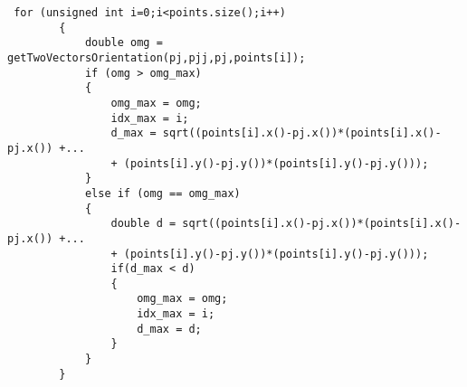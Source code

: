 \documentclass{article}
\begin{document}
\begin{lstlisting}
 for (unsigned int i=0;i<points.size();i++)
        {
            double omg = getTwoVectorsOrientation(pj,pjj,pj,points[i]);
            if (omg > omg_max)
            {
                omg_max = omg;
                idx_max = i;
                d_max = sqrt((points[i].x()-pj.x())*(points[i].x()-pj.x()) +...
                + (points[i].y()-pj.y())*(points[i].y()-pj.y()));
            }
            else if (omg == omg_max)
            {
                double d = sqrt((points[i].x()-pj.x())*(points[i].x()-pj.x()) +...
                + (points[i].y()-pj.y())*(points[i].y()-pj.y()));
                if(d_max < d)
                {
                    omg_max = omg;
                    idx_max = i;
                    d_max = d;
                }
            }
        }
\end{lstlisting}
%
\end{document}
